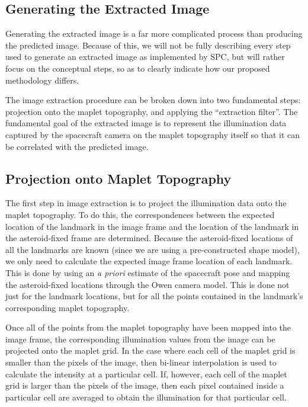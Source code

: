 \documentclass{src/RPI-SIW}
\begin{document}
\subsection*{Generating the Extracted Image}
Generating the extracted image is a far more complicated process than producing the predicted image.  Because of this, we will not be fully describing every step used to generate an extracted image as implemented by SPC, but will rather focus on the conceptual steps, so as to clearly indicate how our proposed methodology differs.  

The image extraction procedure can be broken down into two fundamental steps: projection onto the maplet topography, and applying the ``extraction filter''.  The fundamental goal of the extracted image is to represent the illumination data captured by the spacecraft camera on the maplet topography itself so that it can be correlated with the predicted image.

\subsection*{Projection onto Maplet Topography}
The first step in image extraction is to project the illumination data onto the maplet topography.  To do this, the correspondences between the expected location of the landmark in the image frame and the location of the landmark in the asteroid-fixed frame are determined.  Because the asteroid-fixed locations of all the landmarks are known (since we are using a pre-constructed shape model), we only need to calculate the expected image frame location of each landmark.  This is done by using an \textit{a priori} estimate of the spacecraft pose and mapping the asteroid-fixed locations through the Owen camera model\cite{owen}.  This is done not just for the landmark locations, but for all the points contained in the landmark's corresponding maplet topography. 

Once all of the points from the maplet topography have been mapped into the image frame, the corresponding illumination values from the image can be projected onto the maplet grid.  In the case where each cell of the maplet grid is smaller than the pixels of the image, then bi-linear interpolation is used to calculate the intensity at a particular cell.  If, however, each cell of the maplet grid is larger than the pixels of the image, then each pixel contained inside a particular cell are averaged to obtain the illumination for that particular cell.
\end{document}
